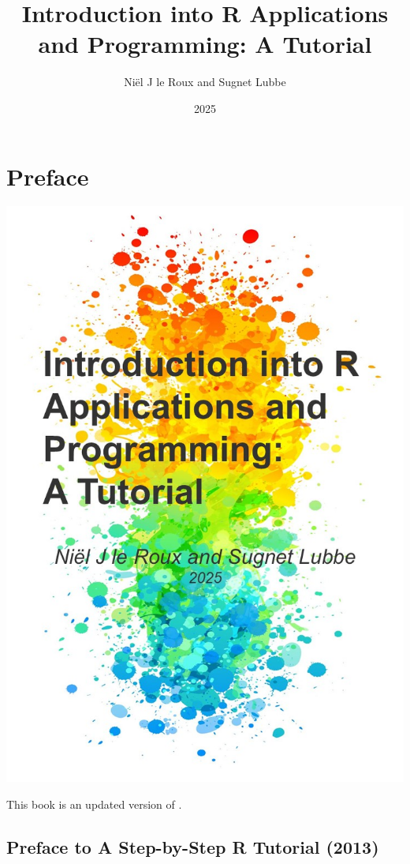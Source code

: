 \documentclass[
]{book}
\title{Introduction into R Applications and Programming: A Tutorial}
\author{Niël J le Roux and Sugnet Lubbe}
\date{2025}
\begin{document}
\maketitle

{
\setcounter{tocdepth}{1}
\tableofcontents
}
\chapter*{Preface}\label{preface}

\includegraphics[width=1\linewidth,height=\textheight,keepaspectratio]{frontcover.jpg}

This book is an updated version of \citep{StepbyStep}.

\section*{Preface to A Step-by-Step R Tutorial (2013)}\label{preface-to-a-step-by-step-r-tutorial-2013}
\end{document}
